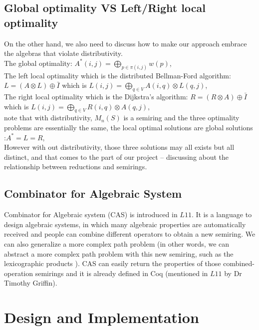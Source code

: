 \documentclass[a4paper,12pt,twoside,openright]{report}
\begin{document}
\section{Global optimality VS Left/Right local optimality}
On the other hand, we also need to discuss how to make our approach embrace the algebras that violate distributivity.\\
The global optimality: $A^*(i,j) = \bigoplus_{p \in \pi (i,j)}w(p)$,\\
The left local optimality which is the distributed Bellman-Ford algorithm: $L = (A\otimes L) \oplus \bar{I}$ which is  $L(i,j) = \bigoplus_{q \in V} A(i,q)\otimes L(q,j)$,\\
The right local optimality which is the Dijkstra's algorithm: $R = (R\otimes A) \oplus \bar{I}$ which is  $L(i,j) = \bigoplus_{q \in V} R(i,q)\otimes A(q,j)$,\\
note that with distributivity, $M_n(S)$ is a semiring and the three optimality problems are essentially the same, the local optimal solutions are global solutions :$A^* = L = R$,\\
However with out distributivity, those three solutions may all exists but all distinct, and that comes to the part of our project -- discussing about the relationship between reductions and semirings.


\section{Combinator for Algebraic System}
Combinator for Algebraic system (CAS)\cite{griffin_metarouting_2005} is introduced in $L11$. It is a language to design algebraic systems, in which many algebraic properties are automatically received and people can combine different operators to obtain a new semiring\cite{griffin_metarouting_2005}. We can also generalize a more complex path problem (in other words, we can abstract a more complex path problem with this new semiring, such as the lexicographic products \cite{gurney_lexicographic_2007}). CAS can easily return the properties of those combined-operation semirings and it is already defined in Coq\cite{Coq} (mentioned in $L11$ by Dr Timothy Griffin).


\chapter{Design and Implementation} 

\end{document}
